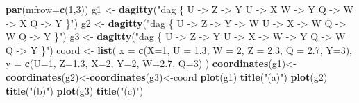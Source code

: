 \documentclass[
]{book}
\newenvironment{Shaded}{\begin{snugshade}}{\end{snugshade}}
\newcommand{\AttributeTok}[1]{\textcolor[rgb]{0.13,0.29,0.53}{#1}}
\newcommand{\DecValTok}[1]{\textcolor[rgb]{0.00,0.00,0.81}{#1}}
\newcommand{\FloatTok}[1]{\textcolor[rgb]{0.00,0.00,0.81}{#1}}
\newcommand{\FunctionTok}[1]{\textcolor[rgb]{0.13,0.29,0.53}{\textbf{#1}}}
\newcommand{\NormalTok}[1]{#1}
\newcommand{\OtherTok}[1]{\textcolor[rgb]{0.56,0.35,0.01}{#1}}
\newcommand{\StringTok}[1]{\textcolor[rgb]{0.31,0.60,0.02}{#1}}
\theoremstyle{definition}
\theoremstyle{definition}
\theoremstyle{definition}
\theoremstyle{definition}
\theoremstyle{remark}
\begin{document}
\begin{Shaded}
\begin{Highlighting}[]
\FunctionTok{par}\NormalTok{(}\AttributeTok{mfrow=}\FunctionTok{c}\NormalTok{(}\DecValTok{1}\NormalTok{,}\DecValTok{3}\NormalTok{))}
\NormalTok{g1 }\OtherTok{\textless{}{-}} \FunctionTok{dagitty}\NormalTok{(}\StringTok{"dag \{}
\StringTok{    U {-}\textgreater{} Z {-}\textgreater{} Y }
\StringTok{    U {-}\textgreater{} X}
\StringTok{    W {-}\textgreater{} Y}
\StringTok{    Q {-}\textgreater{} W {-}\textgreater{} X}
\StringTok{    Q {-}\textgreater{} Y}
\StringTok{    \}"}\NormalTok{)}
\NormalTok{g2 }\OtherTok{\textless{}{-}} \FunctionTok{dagitty}\NormalTok{(}\StringTok{"dag \{}
\StringTok{    U {-}\textgreater{} Z {-}\textgreater{} Y {-}\textgreater{} W }
\StringTok{    U {-}\textgreater{} X {-}\textgreater{} W }
\StringTok{    Q {-}\textgreater{} W}
\StringTok{    Q {-}\textgreater{} Y}
\StringTok{    \}"}\NormalTok{)}
\NormalTok{g3 }\OtherTok{\textless{}{-}} \FunctionTok{dagitty}\NormalTok{(}\StringTok{"dag \{}
\StringTok{    U {-}\textgreater{} Z {-}\textgreater{} Y }
\StringTok{    U {-}\textgreater{} X {-}\textgreater{} W  {-}\textgreater{} Y}
\StringTok{    Q {-}\textgreater{} W}
\StringTok{    Q {-}\textgreater{} Y}
\StringTok{    \}"}\NormalTok{)}
\NormalTok{coord }\OtherTok{\textless{}{-}} 
  \FunctionTok{list}\NormalTok{( }\AttributeTok{x =} \FunctionTok{c}\NormalTok{(}\AttributeTok{X=}\DecValTok{1}\NormalTok{, }\AttributeTok{U =} \FloatTok{1.3}\NormalTok{, }\AttributeTok{W =} \DecValTok{2}\NormalTok{, }\AttributeTok{Z =} \FloatTok{2.3}\NormalTok{, }\AttributeTok{Q =} \FloatTok{2.7}\NormalTok{, }\AttributeTok{Y=}\DecValTok{3}\NormalTok{), }
        \AttributeTok{y =} \FunctionTok{c}\NormalTok{(}\AttributeTok{U=}\DecValTok{1}\NormalTok{,   }\AttributeTok{Z=}\FloatTok{1.3}\NormalTok{, }\AttributeTok{X=}\DecValTok{2}\NormalTok{, }\AttributeTok{Y=}\DecValTok{2}\NormalTok{,   }\AttributeTok{W=}\FloatTok{2.7}\NormalTok{,  }\AttributeTok{Q=}\DecValTok{3}\NormalTok{)}
\NormalTok{  )}
\FunctionTok{coordinates}\NormalTok{(g1)}\OtherTok{\textless{}{-}}\FunctionTok{coordinates}\NormalTok{(g2)}\OtherTok{\textless{}{-}}\FunctionTok{coordinates}\NormalTok{(g3)}\OtherTok{\textless{}{-}}\NormalTok{coord}
\FunctionTok{plot}\NormalTok{(g1)}
\FunctionTok{title}\NormalTok{(}\StringTok{"(a)"}\NormalTok{)}
\FunctionTok{plot}\NormalTok{(g2)}
\FunctionTok{title}\NormalTok{(}\StringTok{"(b)"}\NormalTok{)}
\FunctionTok{plot}\NormalTok{(g3)}
\FunctionTok{title}\NormalTok{(}\StringTok{"(c)"}\NormalTok{)}
\end{Highlighting}
\end{Shaded}
\end{document}

